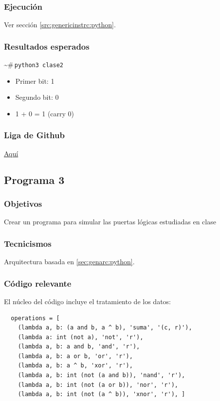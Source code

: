 \documentclass{article}[12pt,a4paper]
\newcommand{\bashps}{\textasciitilde\#\,}
\begin{document}
\subsubsection{Ejecución}

Ver sección \ref{src:genericinstrc:python}.

\subsubsection{Resultados esperados}

\bashps\texttt{python3 clase2}

\begin{itemize}
  \item[] Primer bit: 1
  \item[] Segundo bit: 0
  \item[] 1 + 0 = 1 (carry 0)
\end{itemize}

\subsubsection{Liga de \textbf{Github}}

\href{https://github.com/MarcosHCK/master-programming/tree/master/clase2}{Aquí \faGithubSquare}

\subsection{Programa 3}

\subsubsection{Objetivos}

Crear un programa para simular las puertas lógicas estudiadas en clase

\subsubsection{Tecnicismos}

Arquitectura basada en \ref{sec:genarc:python}.

\subsubsection{Código relevante}

El núcleo del código incluye el tratamiento de los datos:

\begin{verbatim}
  operations = [
    (lambda a, b: (a and b, a ^ b), 'suma', '(c, r)'),
    (lambda a: int (not a), 'not', 'r'),
    (lambda a, b: a and b, 'and', 'r'),
    (lambda a, b: a or b, 'or', 'r'),
    (lambda a, b: a ^ b, 'xor', 'r'),
    (lambda a, b: int (not (a and b)), 'nand', 'r'),
    (lambda a, b: int (not (a or b)), 'nor', 'r'),
    (lambda a, b: int (not (a ^ b)), 'xnor', 'r'), ]
\end{verbatim}
\end{document}
